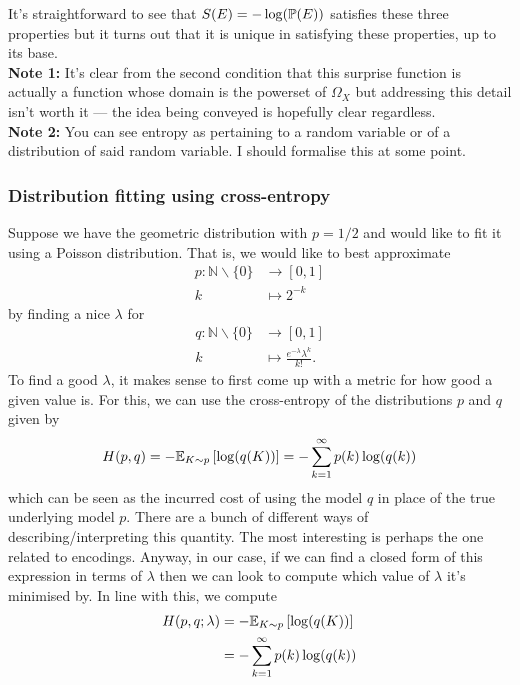 \documentclass[11pt]{article}
\begin{document}
\begin{appendices}
\noindent It's straightforward to see that $S(E)=-\log(\P(E))$ satisfies these three properties but it turns out that it is unique in satisfying these properties, up to its base.\\

\noindent\textbf{Note 1:} It's clear from the second condition that this surprise function is actually a function whose domain is the powerset of $\Omega_X$ but addressing this detail isn't worth it — the idea being conveyed is hopefully clear regardless.\\

\noindent\textbf{Note 2:} You can see entropy as pertaining to a random variable or of a distribution of said random variable. I should formalise this at some point.

\subsubsection{Distribution fitting using cross-entropy}
Suppose we have the geometric distribution with $p=1/2$ and would like to fit it using a Poisson distribution. That is, we would like to best approximate
\begin{align*}
    p:\mathbb{N}\backslash\{0\}&\to[0,1]\\
    k&\mapsto2^{-k}
\end{align*}
by finding a nice $\lambda$ for
\begin{align*}
    q:\mathbb{N}\backslash\{0\}&\to[0,1]\\
    k&\mapsto\frac{e^{-\lambda}\lambda^k}{k!}.
\end{align*}
To find a good $\lambda$, it makes sense to first come up with a metric for how good a given value is. For this, we can use the cross-entropy of the distributions $p$ and $q$ given by
$$
H(p,q)
=
-\E_{K\sim p}\l[\log(q(K))\r]
=
-\sum_{k=1}^{\infty}p(k)\log(q(k))
$$
which can be seen as the incurred cost of using the model $q$ in place of the true underlying model $p$. There are a bunch of different ways of describing/interpreting this quantity. The most interesting is perhaps the one related to encodings. Anyway, in our case, if we can find a closed form of this expression in terms of $\lambda$ then we can look to compute which value of $\lambda$ it's minimised by. In line with this, we compute
\begin{align*}
    H(p,q;\lambda)
    &=
    -\E_{K\sim p}\l[\log(q(K))\r]\\
    &=
    -\sum_{k=1}^{\infty}p(k)\log(q(k))\\

\end{align*}
\end{appendices}
\end{document}
